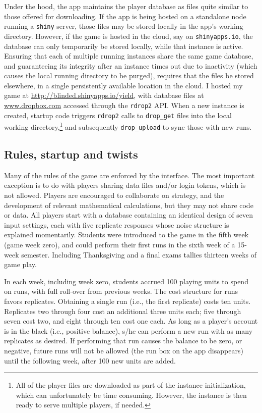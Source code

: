 \documentclass[12pt]{article}
\begin{document}
Under the hood, the app maintains the player database as files quite
similar to those offered for downloading.  If the app is being hosted on a
standalone node running a {\tt shiny} server, those files may be stored
locally in the app's working directory.  However, if the game is hosted in the
cloud, say on
\verb!shinyapps.io!, the database can only temporarily be stored locally,
while that instance is active. Ensuring that each of multiple running
instances share the same game database,  and guaranteeing its integrity after
an instance times out due to inactivity (which causes the local running
directory to be purged), requires that the files be stored elsewhere, in a
single persistently available location in the cloud. I hosted my game at
\url{http://blinded.shinyapps.io/yield}, with database files at
\url{www.dropbox.com} accessed through the {\tt rdrop2} \citep{rdrop2} API.
When a new instance is created, startup code triggers {\tt rdrop2} calls to
\verb!drop_get! files into the local working directory,\footnote{All of the
player files are downloaded as part of the instance initialization, which can
unfortunately be time consuming. However, the instance is then ready to serve
multiple players, if needed.} and subsequently \verb!drop_upload! to sync
those with new runs.

\subsection{Rules, startup and twists}
\label{sec:rules}

Many of the rules of the game are enforced by the interface.  The most
important exception is to do with players sharing data files and/or login
tokens, which is not allowed. Players are encouraged to collaborate on
strategy, and the development of relevant mathematical calculations, but they
may not share code or data.  All players start with a database containing an
identical design of seven input settings, each with five replicate responses
whose noise structure is explained momentarily.  Students were introduced to
the game in the fifth week (game week zero), and could perform their first
runs in the sixth week of a 15-week semester. Including Thanksgiving and a
final exams tallies thirteen weeks of game play.

In each week, including week zero, students accrued 100 playing units to spend
on runs, with full roll-over from previous weeks.  The cost structure for runs
favors replicates.  Obtaining a single run (i.e., the first replicate) costs
ten units.  Replicates two through four cost an additional three units each; five
through seven cost two, and eight through ten cost one each.  As long as a player's
account is in the black (i.e., positive balance), s/he can perform a new run
with as many replicates as desired.  If performing that run causes the balance
to be zero, or negative, future runs will not be allowed (the run box on the
app disappears) until the following week, after 100 new units are added.
\end{document}
